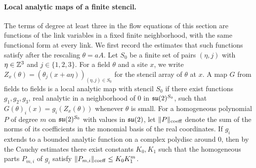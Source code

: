 \paragraph{Local analytic maps of a finite stencil.}
The terms of degree at least three in the flow equations of this section are functions of the link variables in a fixed finite neighborhood, with the same functional form at every link. We first record the estimates that such functions satisfy after the rescaling $\theta=aA$. Let $S_0$ be a finite set of pairs $(\eta,j)$ with $\eta\in\mathbb Z^3$ and $j\in\{1,2,3\}$. For a field $\theta$ and a site $x$, we write $Z_x(\theta)=(\theta_j(x+a\eta))_{(\eta,j)\in S_0}$ for the stencil array of $\theta$ at $x$. A map $G$ from fields to fields is a local analytic map with stencil $S_0$ if there exist functions $g_1,g_2,g_3$, real analytic in a neighborhood of $0$ in $\mathfrak{su}(2)^{S_0}$, such that $G(\theta)_i(x)=g_i(Z_x(\theta))$ whenever $\theta$ is small. For a homogeneous polynomial $P$ of degree $m$ on $\mathfrak{su}(2)^{S_0}$ with values in $\mathfrak{su}(2)$, let $\lVert P\rVert_{\mathrm{coeff}}$ denote the sum of the norms of its coefficients in the monomial basis of the real coordinates. If $g_i$ extends to a bounded analytic function on a complex polydisc around $0$, then by the Cauchy estimates there exist constants $K_0,K_1$ such that the homogeneous parts $P_{m,i}$ of $g_i$ satisfy $\lVert P_{m,i}\rVert_{\mathrm{coeff}}\le K_0K_1^m$.

